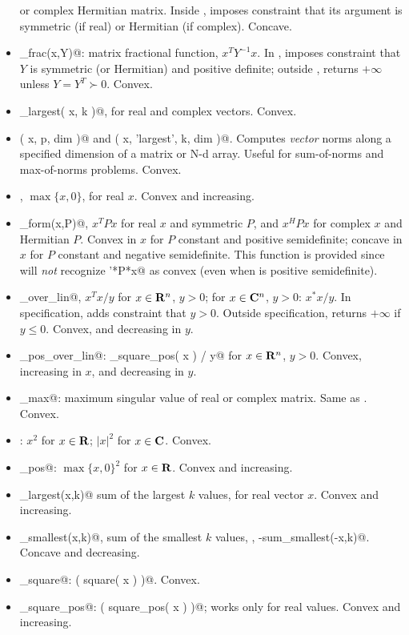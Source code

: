 \documentclass[12pt]{article}
\begin{document}
\begin{itemize}
or complex Hermitian matrix.
Inside \cvx, imposes constraint that its argument 
is symmetric (if real) or Hermitian (if complex).
Concave.
\item \verb@matrix_frac(x,Y)@: matrix fractional function,
$x^TY^{-1}x$.  In \cvx, imposes constraint that $Y$ is 
symmetric (or Hermitian) and positive definite; outside \cvx,
returns $+\infty$ unless $Y=Y^T\succ 0$.
Convex. 
\item \verb@norm_largest( x, k )@, for real and complex vectors.
Convex.
\item \verb@norms( x, p, dim )@ and \verb@norms( x, 'largest', k, dim )@.
Computes \emph{vector} norms along a specified dimension of a matrix
or N-d array. Useful for sum-of-norms and max-of-norms problems.
Convex.
\item \verb@pos@, $\max\{x,0\}$, for real $x$. 
Convex and increasing.
\item \verb@quad_form(x,P)@, $x^TPx$ for real $x$ and symmetric $P$,
and $x^HPx$ for complex $x$ and Hermitian $P$.
Convex in $x$ for $P$ constant and positive semidefinite;
concave in $x$ for $P$ constant and negative semidefinite.
This function is provided since \cvx will \emph{not}
recognize \verb@x'*P*x@ as convex (even when \verb@P@ is 
positive semidefinite).
\item \verb@quad_over_lin@, $x^Tx/y$ for $x \in \R^n$, $y >0$;
for $x \in \mathbf{C}^n$, $y>0$: $x^*x/y$.  In \cvx specification,
adds constraint that $y>0$.  Outside \cvx specification,
returns $+\infty$ if $y\leq 0$.
Convex, and decreasing in $y$.
\item \verb@quad_pos_over_lin@: \verb@sum_square_pos( x ) / y@
for $x\in\R^n$, $y>0$.
Convex, increasing in $x$, and decreasing in $y$.
\item \verb@sigma_max@: maximum singular value of real or 
complex matrix.  Same as \verb@norm@.  Convex.
\item \verb@square@: $x^2$ for $x \in \R$;
$|x|^2$ for $x \in \mathbf{C}$.
Convex.
\item \verb@square_pos@: $\max\{x,0\}^2$ for $x\in\R$.
Convex and increasing.
\item \verb@sum_largest(x,k)@ sum of the largest $k$ values, for
real vector $x$.
Convex and increasing.
\item \verb@sum_smallest(x,k)@, sum of the smallest $k$ values,
\ie, \verb@-sum_smallest(-x,k)@.
Concave and decreasing.
\item \verb@sum_square@: \verb@sum( square( x ) )@. Convex.
\item \verb@sum_square_pos@: \verb@sum( square_pos( x ) )@; 
works only for real values. Convex and increasing.
\end{itemize}
\end{document}
